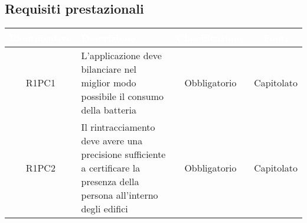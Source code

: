 \subsection{Requisiti prestazionali}
{
\renewcommand{\arraystretch}{1.5}
\centering
\begin{longtable}{ c C{8cm} c c}
\textcolor{white}{\textbf{Identificativo}} & \textcolor{white}{\textbf{Descrizione}} & \textcolor{white}{\textbf{Classificazione}} & \textcolor{white}{\textbf{Fonti}}\\	
\endhead

R1PC1 & L'applicazione deve bilanciare nel miglior modo possibile il consumo della batteria & Obbligatorio & Capitolato\\

R1PC2 & Il rintracciamento deve avere una precisione sufficiente a certificare la presenza della persona all'interno degli edifici & Obbligatorio & Capitolato\\

\end{longtable}
}